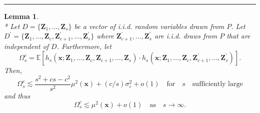 \documentclass[letterpaper,10pt]{article}
\numberwithin{equation}{section}
\numberwithin{thm}{section}
\newtheorem{lem}{Lemma}
\numberwithin{lem}{section}
\numberwithin{cor}{section}
\newcommand{\E}{\mathbb{E}}
\newcommand{\1}{\mathbbm{1}}
\begin{document}
\hrule

\begin{lem}\label{lem_omega_sc}\mbox{}\\*
	Let $D = \{\mathbf{Z}_1, \dotsc, \mathbf{Z}_{s}\}$ be a vector of i.i.d. random variables drawn from $P$.
	Let $D^{\prime} = \{\mathbf{Z}_1, \dotsc, \mathbf{Z}_{c}, \mathbf{Z}_{c+1}^{\prime}, \dotsc,  \mathbf{Z}_{s}^{\prime}\}$ where $\mathbf{Z}_{c+1}^{\prime}, \dotsc,  \mathbf{Z}_{s}^{\prime}$ are i.i.d. draws from $P$ that are independent of $D$.
	Furthermore, let
	\begin{equation}
		\Omega_{s}^{c}
		= \E\left[h_{s}\left(\mathbf{x}; \mathbf{Z}_1, \ldots, \mathbf{Z}_{c}, \mathbf{Z}_{c+1}, \ldots, \mathbf{Z}_{s}\right) \cdot
			h_{s}\left(\mathbf{x}; \mathbf{Z}_1, \ldots,\mathbf{Z}_{c}, \mathbf{Z}_{c+1}^{\prime}, \ldots, \mathbf{Z}_{s}^{\prime}\right)\right].
	\end{equation}
	Then,
	\begin{equation}
		\Omega_{s}^{c}
		\lesssim \frac{s^2 + cs  - c^2}{s^2} \mu^2(\mathbf{x}) + (c/s) \sigma_{\varepsilon}^2 + o(1)
		\quad \text{for} \quad s \quad \text{sufficiently large}
	\end{equation}
	and thus
	\begin{equation}
		\Omega_{s}^{c}
		\lesssim \mu^2(\mathbf{x}) + o(1)
		\quad \text{as} \quad s \rightarrow \infty.
	\end{equation}
\end{lem}
\end{document}
